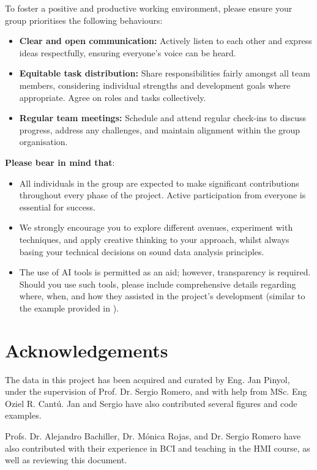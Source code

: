 \documentclass[11pt]{exam}
\begin{document}
    To foster a positive and productive working environment, please ensure your group prioritises the following behaviours:
    \begin{itemize}
        \item \textbf{Clear and open communication:} Actively listen to each other and express ideas respectfully, ensuring everyone's voice can be heard.
        \item \textbf{Equitable task distribution:} Share responsibilities fairly amongst all team members, considering individual strengths and development goals where appropriate. Agree on roles and tasks collectively.
        \item \textbf{Regular team meetings:} Schedule and attend regular check-ins to discuss progress, address any challenges, and maintain alignment within the group organisation.
    \end{itemize}
    \vspace*{5mm}
    \textbf{Please bear in mind that}:
    \begin{itemize}
        \item All individuals in the group are expected to make significant contributions throughout every phase of the project. Active participation from everyone is essential for success.
        \item We strongly encourage you to explore different avenues, experiment with techniques, and apply creative thinking to your approach, whilst always basing your technical decisions on sound data analysis principles.
        \item The use of AI tools is permitted as an aid; however, transparency is required. Should you use such tools, please include comprehensive details regarding where, when, and how they assisted in the project's development (similar to the example provided in ).
    \end{itemize}

    \newpage
    \section{Acknowledgements}
    The data in this project has been acquired and curated by Eng. Jan Pinyol, under the supervision of Prof. Dr. Sergio Romero, and with help from MSc. Eng Oziel R. Cantú. Jan and Sergio have also contributed several figures and code examples.

    Profs. Dr. Alejandro Bachiller, Dr. Mónica Rojas, and Dr. Sergio Romero have also contributed with their experience in BCI and teaching in the HMI course, as well as reviewing this document.
\end{document}
